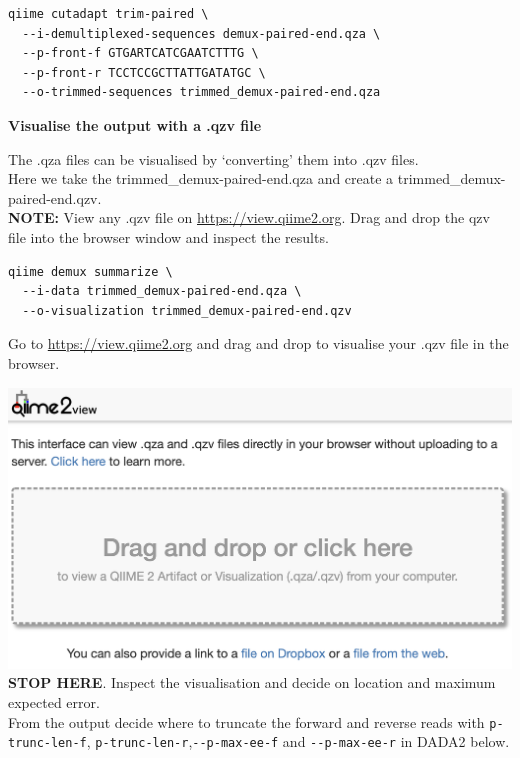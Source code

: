 \documentclass[
]{book}
\begin{document}
\begin{verbatim}
qiime cutadapt trim-paired \
  --i-demultiplexed-sequences demux-paired-end.qza \
  --p-front-f GTGARTCATCGAATCTTTG \
  --p-front-r TCCTCCGCTTATTGATATGC \
  --o-trimmed-sequences trimmed_demux-paired-end.qza
\end{verbatim}

\hfill\break

\textbf{Visualise the output with a .qzv file}

The .qza files can be visualised by `converting' them into .qzv files.\\
Here we take the trimmed\_demux-paired-end.qza and create a trimmed\_demux-paired-end.qzv.\\
\textbf{NOTE:} View any .qzv file on \url{https://view.qiime2.org}. Drag and drop the qzv file into the browser window and inspect the results.

\begin{verbatim}
qiime demux summarize \
  --i-data trimmed_demux-paired-end.qza \
  --o-visualization trimmed_demux-paired-end.qzv
\end{verbatim}

Go to \url{https://view.qiime2.org} and drag and drop to visualise your .qzv file in the browser.

\includegraphics{./img/viewqiime.png}\\

\textbf{STOP HERE}. Inspect the visualisation and decide on location and maximum expected error.\\
From the output decide where to truncate the forward and reverse reads with \texttt{p-trunc-len-f}, \texttt{p-trunc-len-r},\texttt{-\/-p-max-ee-f} and \texttt{-\/-p-max-ee-r} in DADA2 below.
\end{document}
